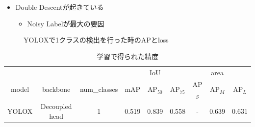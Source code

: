\documentclass[a4j]{ujarticle}
\begin{document}
\begin{itemize}
\begin{minipage}{.95\textwidth}
{\begin{minipage}[h]{.54\textwidth}
                    \end{minipage}
                }
                {
                    \begin{minipage}[h]{.54\textwidth}
                        \setcounter{figure}{3}
                    \end{minipage}
                }
            \end{minipage}

            \begin{itemize}
                \item Double Descent\cite{double_descent}が起きている
                \begin{itemize}
                    \item Noisy Labelが最大の要因
                \end{itemize}
            \end{itemize}
            \begin{figure}[h]
                \centering
                \caption{YOLOXで1クラスの検出を行った時のAPとloss}
            \end{figure}
            \begin{table}[h]
                \centering
                \caption{学習で得られた精度}
                \label{tab:exp}
                \begin{tabular}{ccc|ccc|ccc}
                    & & & & IoU & & & area \footnotemark & \\
                    model & backbone & num\_classes & mAP & AP$_{50}$ & AP$_{75}$ & AP$_S$ & AP$_M$ & AP$_L$ \\ \hline
                    YOLOX\cite{yolox} & Decoupled head & 1 & 0.519 & 0.839 & 0.558 & - & 0.639 & 0.631 \\
                \end{tabular}
            \end{table}


\end{itemize}
\end{document}
